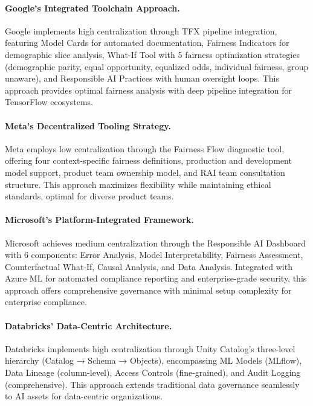\documentclass[manuscript,screen,9pt]{acmart}
\begin{document}
\paragraph{Google's Integrated Toolchain Approach.} Google implements high centralization through TFX pipeline integration, featuring Model Cards for automated documentation, Fairness Indicators for demographic slice analysis, What-If Tool with 5 fairness optimization strategies (demographic parity, equal opportunity, equalized odds, individual fairness, group unaware), and Responsible AI Practices with human oversight loops. This approach provides optimal fairness analysis with deep pipeline integration for TensorFlow ecosystems.

\paragraph{Meta's Decentralized Tooling Strategy.} Meta employs low centralization through the Fairness Flow diagnostic tool, offering four context-specific fairness definitions, production and development model support, product team ownership model, and RAI team consultation structure. This approach maximizes flexibility while maintaining ethical standards, optimal for diverse product teams.

\paragraph{Microsoft's Platform-Integrated Framework.} Microsoft achieves medium centralization through the Responsible AI Dashboard with 6 components: Error Analysis, Model Interpretability, Fairness Assessment, Counterfactual What-If, Causal Analysis, and Data Analysis. Integrated with Azure ML for automated compliance reporting and enterprise-grade security, this approach offers comprehensive governance with minimal setup complexity for enterprise compliance.

\paragraph{Databricks' Data-Centric Architecture.} Databricks implements high centralization through Unity Catalog's three-level hierarchy (Catalog → Schema → Objects), encompassing ML Models (MLflow), Data Lineage (column-level), Access Controls (fine-grained), and Audit Logging (comprehensive). This approach extends traditional data governance seamlessly to AI assets for data-centric organizations.
\end{document}
